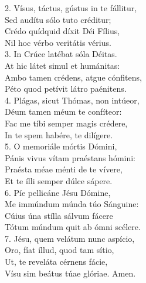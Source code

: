 2. Vísus, táctus, gústus in te fállitur, \\
Sed audítu sólo tuto créditur; \\
Crédo quídquid díxit Déi Fílius, \\
Nil hoc vérbo veritátis vérius. \\

3. In Crúce latébat sóla Déitas. \\
At hic látet simul et humánitas: \\
Ambo tamen crédens, atgue cónfitens, \\
Péto quod petívit látro paénitens. \\

4. Plágas, sicut Thómas, non intúeor, \\
Déum tamen méum te confíteor: \\
Fac me tíbi semper magis crédere, \\
In te spem habére, te dilígere. \\

5. O memoriále mórtis Dómini, \\
Pánis vivus vítam praéstans hómini: \\
Praésta méae ménti de te vívere, \\
Et te ílli semper dúlce sápere. \\

6. Píe pellicáne Jésu Dómine, \\
Me immúndum múnda túo Sánguine: \\
Cúius úna stílla sálvum fácere \\
Tótum múndum quit ab ómni scélere. \\

7. Jésu, quem velátum nunc aspício, \\
Oro, fíat íllud, quod tam sítio, \\
Ut, te reveláta cérnens fácie, \\
Vísu sim beátus túae glóriae. Amen. \\



